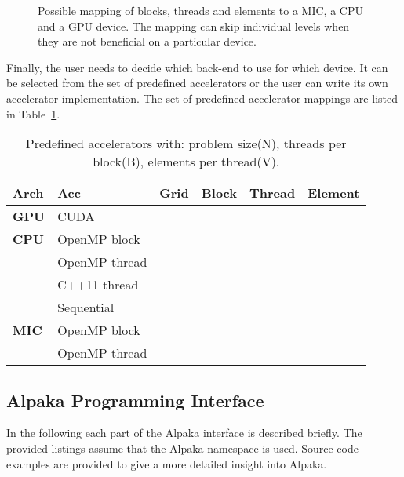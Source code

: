 \documentclass[10pt, twocolumn]{article}
\newcommand{\alpaka}{Alpaka\xspace}
\newcommand{\cuda}{{CUDA}\xspace}
\newcommand{\openmp}{{OpenMP}\xspace}
\begin{document}
\begin{figure}[th]
  \centerline
      {}
      \caption{Possible mapping of blocks, threads and elements to a MIC, a CPU and a GPU device. The mapping can skip individual levels when they are not beneficial on a particular device.}
      \label{fig:mapping}
      \vspace{-0.5em}
\end{figure}

\noindent Finally, the user needs to decide which back-end to use for which device.
It can be selected from the set of predefined accelerators or the user can write its own accelerator implementation.
The set of predefined accelerator mappings are listed in Table~\ref{tab:accelerators}.
\begin{table}[!htbp]
  \scriptsize
\caption{Predefined accelerators with: problem size(N), threads per block(B), elements per thread(V).}
  \begin{center}
    \begin{tabular}{ | l | l | c | c | c | c |}
      \hline
      Arch & Acc & Grid & Block & Thread & Element\\
      \hline
      \hline
      \textbf{GPU} & \cuda &  &  &  & \\
\hline
      \textbf{CPU} & \openmp block &  &  &  & \\
      & \openmp thread &  &  &  & \\
      & C++11 thread &  &  &  & \\
& Sequential &  &  &  & \\
\hline
      \textbf{MIC} & \openmp block &  &  &  & \\
      & \openmp thread &  &  &  & \\
      \hline
    \end{tabular}

  \end{center}
  \label{tab:accelerators}
\end{table}











\subsection{Alpaka Programming Interface}
\label{subsec:interface}
In the following each part of the \alpaka interface is described briefly.
The provided listings assume that the \alpaka namespace is used.
Source code examples are provided to give a more detailed insight into \alpaka.
\end{document}
